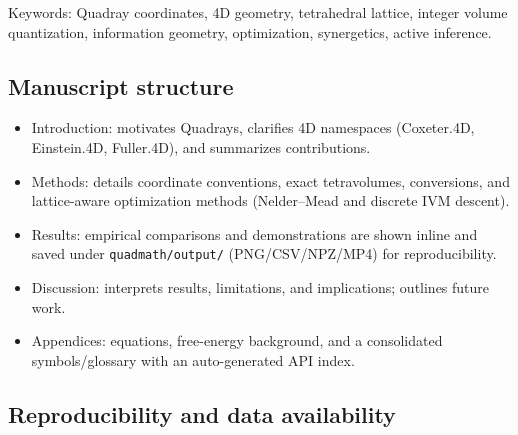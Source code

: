 \documentclass[
  10pt,
]{article}
\providecommand{\tightlist}{%
  \setlength{\itemsep}{0pt}\setlength{\parskip}{0pt}}
\begin{document}
Keywords: Quadray coordinates, 4D geometry, tetrahedral lattice, integer
volume quantization, information geometry, optimization, synergetics,
active inference.

\hypertarget{manuscript-structure}{%
\subsection{Manuscript structure}\label{manuscript-structure}}

\begin{itemize}
\tightlist
\item
  Introduction: motivates Quadrays, clarifies 4D namespaces (Coxeter.4D,
  Einstein.4D, Fuller.4D), and summarizes contributions.
\item
  Methods: details coordinate conventions, exact tetravolumes,
  conversions, and lattice-aware optimization methods (Nelder--Mead and
  discrete IVM descent).
\item
  Results: empirical comparisons and demonstrations are shown inline and
  saved under \texttt{quadmath/output/} (PNG/CSV/NPZ/MP4) for
  reproducibility.
\item
  Discussion: interprets results, limitations, and implications;
  outlines future work.
\item
  Appendices: equations, free-energy background, and a consolidated
  symbols/glossary with an auto-generated API index.
\end{itemize}

\hypertarget{reproducibility-and-data-availability}{%
\subsection{Reproducibility and data
availability}\label{reproducibility-and-data-availability}}
\end{document}
